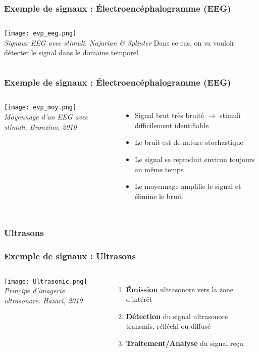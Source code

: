 \documentclass{beamer}
\begin{document}
\begin{frame}
\frametitle{Exemple de signaux : \'Electroencéphalogramme (EEG)}
\begin{columns}
\column{60mm}
\texttt{[image: evp\_eeg.png]}\\
\textit{\footnotesize Signaux EEG avec stimuli. Najarian \& Splinter}
\column{60mm}
Dans ce cas, on va vouloir détecter le signal dans le domaine temporel
\end{columns}

\end{frame}

\begin{frame}
\frametitle{Exemple de signaux : \'Electroencéphalogramme (EEG)}
\begin{columns}
\column{60mm}
\texttt{[image: evp\_moy.png]}\\
\textit{\footnotesize Moyennage d'un EEG avec stimuli. Bronzino, 2010}
\column{60mm}
\begin{itemize}
\item Signal brut très bruité $\rightarrow$ stimuli difficilement identifiable
\vspace{0.2cm}
\item Le bruit est de nature stochastique 
\vspace{0.2cm}
\item Le signal se reproduit environ toujours au même temps
\vspace{0.2cm}
\item Le moyennage amplifie le signal et élimine le bruit.
\end{itemize}
\end{columns}

\end{frame}

\subsubsection{Ultrasons}
\begin{frame}
\frametitle{Exemple de signaux : Ultrasons}
\begin{columns}
\column{60mm}
\texttt{[image: Ultrasonic.png]}\\
\textit{\footnotesize Principe d'imagerie ultrasonore. Hazari, 2010}
\column{60mm}
\begin{enumerate}
\item<2-> \textbf{\'Emission} ultrasonore vers la zone d'intérêt
\vspace{0.2cm}
\item<3-> \textbf{Détection} du signal ultrasonore transmis, réfléchi ou diffusé
\vspace{0.2cm}
\item<4-> \textbf{Traitement/Analyse} du signal reçu
\end{enumerate}
\end{columns}
\end{frame}
\end{document}
